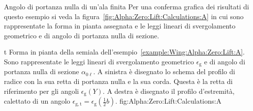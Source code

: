 \begin{myExampleX}{Angolo di portanza nulla di un'ala finita}{}
Per una conferma grafica dei risultati di questo esempio si veda la 
figura~\ref{fig:Alpha:Zero:Lift:Calculations:A} in cui sono rappresentate
la forma in pianta assegnata e le leggi lineari di svergolamento 
geometrico e di angolo di portanza nulla di sezione.

\end{myExampleX}

%
\EnlargedFigureX%
  {t}%
  {%
  }%
  {
    Forma in pianta della semiala dell'esempio~\ref{example:Wing:Alpha:Zero:Lift:A}.
    Sono rappresentate le leggi lineari di svergolamento geometrico $\epsilon_\mathrm{g}$ 
    e di angolo di portanza nulla di sezione $\alpha_{0\ell}$.
    A sinistra è disegnato lo schema del profilo di radice con la sua retta di portanza nulla e
    la sua corda. Questa è la retta di riferimento per gli angoli $\epsilon_\mathrm{g}(Y)$. 
    A destra è disegnato il profilo d'estremità, calettato di un angolo 
    $\epsilon_{\mathrm{g,t}}=\epsilon_\mathrm{g}(\frac{1}{2}b)$.%
  }%
  {fig:Alpha:Zero:Lift:Calculations:A}%
%
%

